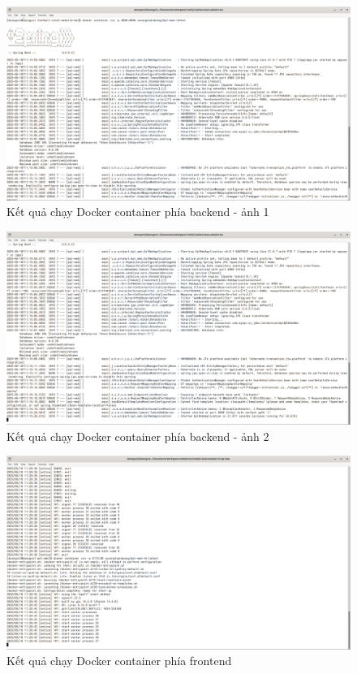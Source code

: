 \documentclass[../BTL.tex]{subfiles}
\begin{document}
\begin{figure}
    \centering
    \includegraphics[width=1\linewidth]{Hinhve/docker-container-run-be1.png}
    \caption{ Kết quả chạy Docker container phía backend - ảnh 1}
    \label{fig:docker-container-run-be1}
\end{figure}
\begin{figure}
    \centering
    \includegraphics[width=1\linewidth]{Hinhve/docker-container-run-be2.png}
    \caption{Kết quả chạy Docker container phía backend - ảnh 2}
    \label{fig:docker-container-run-be2}
\end{figure}
\begin{figure}
    \centering
    \includegraphics[width=1\linewidth]{Hinhve/docker-container-run-fe.png}
    \caption{Kết quả chạy Docker container phía frontend}
    \label{fig:docker-container-run-fe}
\end{figure}
\end{document}
